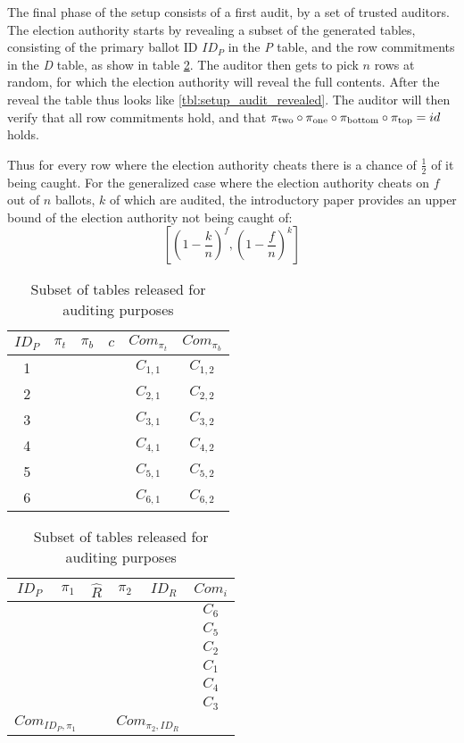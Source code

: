 The final phase of the setup consists of a first audit, by a set of trusted
auditors. The election authority starts by revealing a subset of the generated
tables, consisting of the primary ballot ID $ID_P$ in the \emph{P} table, and
the row commitments in the \emph{D} table, as show in table
\ref{tbl:setup_audit}. The auditor then gets to pick $n$ rows at random, for
which the election authority will reveal the full contents. After the reveal
the table thus looks like \ref{tbl:setup_audit_revealed}. The auditor will then
verify that all row commitments hold, and that $\pi_{\text{two}} \circ \pi_{\text{one}} \circ
\pi_{\text{bottom}} \circ \pi_{\text{top}} = id$ holds.

Thus for every row where the election authority cheats there is a chance of
$\frac{1}{2}$ of it being caught. For the generalized case where the election
authority cheats on $f$ out of $n$ ballots, $k$ of which are audited, the
introductory paper\autocite{fisherPunchscanIntroductionSystem2006} provides an
upper bound of the election authority not being
caught of:
\[
	[(1 - \frac{k}{n})^f, (1 - \frac{f}{n})^k]
\]

\begin{table}
	\centering
	\begin{subtable}{.5\linewidth}
		\begin{tabular}{|c|c|c|c|c|c|}
			\hline
			$ID_P$ & $\pi_{t}$ & $\pi_{b}$ & $c$ & $Com_{\pi_{t}}$ & $Com_{\pi_{b}}$ \\
			\hline
			1 & & & & $C_{1, 1}$ & $C_{1, 2}$ \\
			2 & & & & $C_{2, 1}$ & $C_{2, 2}$ \\
			3 & & & & $C_{3, 1}$ & $C_{3, 2}$ \\
			4 & & & & $C_{4, 1}$ & $C_{4, 2}$ \\
			5 & & & & $C_{5, 1}$ & $C_{5, 2}$ \\
			6 & & & & $C_{6, 1}$ & $C_{6, 2}$ \\
			\hline
		\end{tabular}
	\end{subtable}%
	\begin{subtable}{.5\linewidth}
		\begin{tabular}{|c|c|c|c|c|c|}
			\hline
			$ID_P$ & $\pi_1$ & $\hat{R}$ & $\pi_2$ & $ID_R$ & $Com_{i}$ \\
			\hline
			& & & & & $C_6$ \\
			& & & & & $C_5$ \\
			& & & & & $C_2$ \\
			& & & & & $C_1$ \\
			& & & & & $C_4$ \\
			& & & & & $C_3$ \\
			\hline
			\multicolumn{2}{|c|}{$Com_{ID_P, \pi_1}$} &   & \multicolumn{2}{c|}{$Com_{\pi_2, ID_R}$} & \\
			\hline
		\end{tabular}
	\end{subtable}
	\caption{Subset of tables released for auditing purposes}
	\label{tbl:setup_audit}
\end{table}

